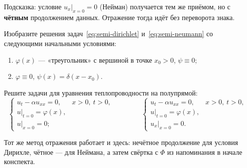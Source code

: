 \begin{idea}
Подсказка: условие $u_x|_{x=0} = 0$ (Нейман) получается тем же приёмом, но с
\textbf{чётным} продолжением данных. Отражение тогда идёт без переворота знака.
\end{idea}

\begin{exercise}
Изобразите решения задач~\eqref{eq:semi-dirichlet} и~\eqref{eq:semi-neumann} со
следующими начальными условиями:
\begin{enumerate}[label=(\alph*), leftmargin=2em]
  \item $\varphi(x)$ — «треугольник» с вершиной в точке $x_0 > 0$, $\psi \equiv 0$;
  \item $\varphi \equiv 0$, $\psi(x) = \delta(x - x_0)$.
\end{enumerate}
\end{exercise}

\begin{exercise}
Решите задачи для уравнения теплопроводности на полупрямой:
\[
  \begin{cases}
    u_t - \alpha u_{xx} = 0, & x > 0,\ t > 0, \\
    u|_{t=0} = \varphi(x), \\
    u|_{x=0} = 0 ;
  \end{cases}
  \qquad\qquad
  \begin{cases}
    u_t - \alpha u_{xx} = 0, & x > 0,\ t > 0, \\
    u|_{t=0} = \varphi(x), \\
    u_x|_{x=0} = 0 .
  \end{cases}
\]
\end{exercise}

\begin{idea}
Тот же метод отражения работает и здесь: нечётное продолжение для условия
Дирихле, чётное — для Неймана, а затем свёртка с $\Phi$ из напоминания в начале
конспекта.
\end{idea}
